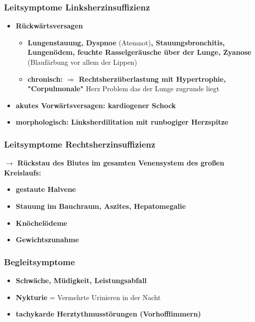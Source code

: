 		\subsubsection{Leitsymptome Linksherzinsuffizienz}
			\begin{itemize}
				\item \textbf{Rückwärtsversagen}
					\begin{itemize}
						\item \textbf{Lungenstauung, Dyspnoe} (Atemnot)\textbf{, Stauungsbronchitis, Lungenödem, feuchte Rasselgeräusche über der Lunge, Zyanose} (Blaufärbung vor allem der Lippen)
						\item \textbf{chronisch: $\Rightarrow$ Rechtsherzüberlastung mit Hypertrophie, "Corpulmonale"} Herz Problem das der Lunge zugrunde liegt
					\end{itemize}
				\item \textbf{akutes Vorwärtsversagen: kardiogener Schock}
				\item \textbf{morphologisch: Linksherdilitation mit runbogiger Herzspitze}
			\end{itemize}
		\subsubsection{Leitsymptome Rechtsherzinsuffizienz}
			\textbf{$\rightarrow$ Rückstau des Blutes im gesamten Venensystem des großen Kreislaufs:}
			\begin{itemize}
				\item \textbf{gestaute Halvene}
				\item \textbf{Stauung im Bauchraum, Aszites, Hepatomegalie}
				\item \textbf{Knöchelödeme}
				\item \textbf{Gewichtszunahme}
			\end{itemize}
		\subsubsection{Begleitsymptome}
			\begin{itemize}
				\item \textbf{Schwäche, Müdigkeit, Leistungsabfall}
				\item \textbf{Nykturie} = Vermehrte Urinieren in der Nacht
				\item \textbf{tachykarde Herztythmusstörungen (Vorhofflimmern)}
			\end{itemize}
